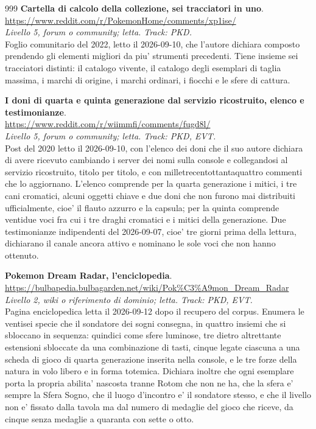 \begin{thebibliography}{999}
  \textbf{Cartella di calcolo della collezione, sei tracciatori in uno}.
  \\ \url{https://www.reddit.com/r/PokemonHome/comments/xp1ise/}
  \\ \emph{Livello 5, forum o community; letta. Track: PKD.}
  \\ Foglio comunitario del 2022, letto il 2026-09-10, che l'autore dichiara composto prendendo gli elementi migliori da piu' strumenti precedenti. Tiene insieme sei tracciatori distinti: il catalogo vivente, il catalogo degli esemplari di taglia massima, i marchi di origine, i marchi ordinari, i fiocchi e le sfere di cattura.

  \textbf{I doni di quarta e quinta generazione dal servizio ricostruito, elenco e testimonianze}.
  \\ \url{https://www.reddit.com/r/wiimmfi/comments/fugd8l/}
  \\ \emph{Livello 5, forum o community; letta. Track: PKD, EVT.}
  \\ Post del 2020 letto il 2026-09-10, con l'elenco dei doni che il suo autore dichiara di avere ricevuto cambiando i server dei nomi sulla console e collegandosi al servizio ricostruito, titolo per titolo, e con milletrecentottantaquattro commenti che lo aggiornano. L'elenco comprende per la quarta generazione i mitici, i tre cani cromatici, alcuni oggetti chiave e due doni che non furono mai distribuiti ufficialmente, cioe' il flauto azzurro e la capsula; per la quinta comprende ventidue voci fra cui i tre draghi cromatici e i mitici della generazione. Due testimonianze indipendenti del 2026-09-07, cioe' tre giorni prima della lettura, dichiarano il canale ancora attivo e nominano le sole voci che non hanno ottenuto.

  \textbf{Pokemon Dream Radar, l'enciclopedia}.
  \\ \url{https://bulbapedia.bulbagarden.net/wiki/Pok\%C3\%A9mon_Dream_Radar}
  \\ \emph{Livello 2, wiki o riferimento di dominio; letta. Track: PKD, EVT.}
  \\ Pagina enciclopedica letta il 2026-09-12 dopo il recupero del corpus. Enumera le ventisei specie che il sondatore dei sogni consegna, in quattro insiemi che si sbloccano in sequenza: quindici come sfere luminose, tre dietro altrettante estensioni sbloccate da una combinazione di tasti, cinque legate ciascuna a una scheda di gioco di quarta generazione inserita nella console, e le tre forze della natura in volo libero e in forma totemica. Dichiara inoltre che ogni esemplare porta la propria abilita' nascosta tranne Rotom che non ne ha, che la sfera e' sempre la Sfera Sogno, che il luogo d'incontro e' il sondatore stesso, e che il livello non e' fissato dalla tavola ma dal numero di medaglie del gioco che riceve, da cinque senza medaglie a quaranta con sette o otto.


\end{thebibliography}
